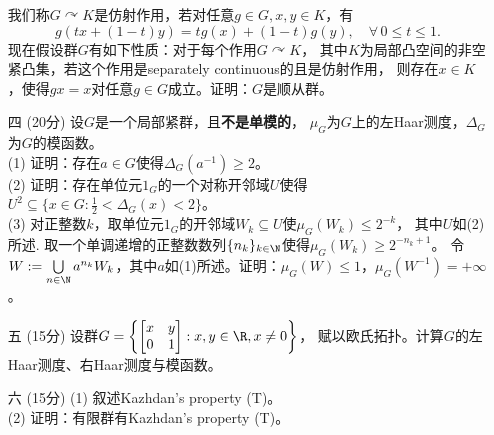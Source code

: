 \begin{enumerate}
    我们称$G \curvearrowright K$是仿射作用，若对任意$g \in G,x,y \in K$，有
    \[g(tx+(1-t)y)=tg(x)+(1-t)g(y),\quad\forall\,0 \leqslant t \leqslant 1.\]
    现在假设群$G$有如下性质：对于每个作用$G \curvearrowright K$，
    其中$K$为局部凸空间的非空紧凸集，若这个作用是separately continuous的且是仿射作用，
    则存在$x \in K$，使得$gx=x$对任意$g\in G$成立。证明：$G$是顺从群。
    \item[四] (20分) 设$G$是一个局部紧群，且\textbf{不是单模的}，
    $\mu_G$为$G$上的左Haar测度，$\Delta_G$为$G$的模函数。\\
    (1) 证明：存在$a\in G$使得$\Delta_G(a^{-1})\geqslant2$。\\
    (2) 证明：存在单位元$1_G$的一个对称开邻域$U$使得$U^2\subseteq\{x\in G:\frac{1}{2}<\Delta_G(x)<2\}$。\\
    (3) 对正整数$k$，取单位元$1_G$的开邻域$W_k\subseteq U$使$\mu_G(W_k)\leqslant2^{-k}$，
    其中$U$如(2)所述. 取一个单调递增的正整数数列$\{n_k\}_{k\in\N}$使得$\mu_G(W_k)\geqslant2^{-n_k+1}$。
    令$W:=\bigcup\limits_{n\in\N}a^{n_k}W_k$，其中$a$如(1)所述。证明：$\mu_G(W)\leqslant1$，$\mu_G(W^{-1})=+\infty$。
    \item[五] (15分) 设群$G=\left\{\begin{bmatrix}x&y\\0&1\end{bmatrix}:x,y\in\R,x\ne0\right\}$，
    赋以欧氏拓扑。计算$G$的左Haar测度、右Haar测度与模函数。
    \item[六] (15分) (1) 叙述Kazhdan's property (T)。\\
    (2) 证明：有限群有Kazhdan's property (T)。
\end{enumerate}

